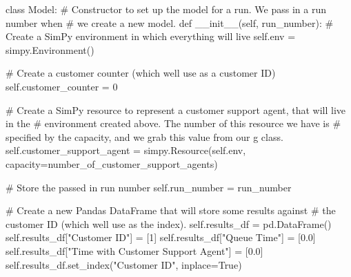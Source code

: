 \documentclass[
  letterpaper,
  DIV=11,
  numbers=noendperiod]{scrreprt}
\newenvironment{Shaded}{\begin{snugshade}}{\end{snugshade}}
\newcommand{\CommentTok}[1]{\textcolor[rgb]{0.37,0.37,0.37}{#1}}
\newcommand{\DecValTok}[1]{\textcolor[rgb]{0.68,0.00,0.00}{#1}}
\newcommand{\FloatTok}[1]{\textcolor[rgb]{0.68,0.00,0.00}{#1}}
\newcommand{\FunctionTok}[1]{\textcolor[rgb]{0.28,0.35,0.67}{#1}}
\newcommand{\KeywordTok}[1]{\textcolor[rgb]{0.00,0.23,0.31}{#1}}
\newcommand{\NormalTok}[1]{\textcolor[rgb]{0.00,0.23,0.31}{#1}}
\newcommand{\OperatorTok}[1]{\textcolor[rgb]{0.37,0.37,0.37}{#1}}
\newcommand{\StringTok}[1]{\textcolor[rgb]{0.13,0.47,0.30}{#1}}
\newcommand{\VariableTok}[1]{\textcolor[rgb]{0.07,0.07,0.07}{#1}}
\begin{document}
\begin{tcolorbox}[enhanced jigsaw, rightrule=.15mm, colback=white, colframe=quarto-callout-note-color-frame, colbacktitle=quarto-callout-note-color!10!white, toprule=.15mm, coltitle=black, opacityback=0, titlerule=0mm, bottomtitle=1mm, breakable, title=\textcolor{quarto-callout-note-color}{\faInfo}\hspace{0.5em}{Full Example model class}, opacitybacktitle=0.6, toptitle=1mm, arc=.35mm, bottomrule=.15mm, leftrule=.75mm, left=2mm]

\begin{Shaded}
\begin{Highlighting}[]
\KeywordTok{class}\NormalTok{ Model:}
    \CommentTok{\# Constructor to set up the model for a run.  We pass in a run number when}
    \CommentTok{\# we create a new model.}
    \KeywordTok{def} \FunctionTok{\_\_init\_\_}\NormalTok{(}\VariableTok{self}\NormalTok{, run\_number):}
        \CommentTok{\# Create a SimPy environment in which everything will live}
        \VariableTok{self}\NormalTok{.env }\OperatorTok{=}\NormalTok{ simpy.Environment()}

        \CommentTok{\# Create a customer counter (which we\textquotesingle{}ll use as a customer ID)}
        \VariableTok{self}\NormalTok{.customer\_counter }\OperatorTok{=} \DecValTok{0}

        \CommentTok{\# Create a SimPy resource to represent a customer support agent, that will live in the}
        \CommentTok{\# environment created above.  The number of this resource we have is}
        \CommentTok{\# specified by the capacity, and we grab this value from our g class.}
        \VariableTok{self}\NormalTok{.customer\_support\_agent }\OperatorTok{=}\NormalTok{ simpy.Resource(}\VariableTok{self}\NormalTok{.env, capacity}\OperatorTok{=}\NormalTok{number\_of\_customer\_support\_agents)}

        \CommentTok{\# Store the passed in run number}
        \VariableTok{self}\NormalTok{.run\_number }\OperatorTok{=}\NormalTok{ run\_number}

        \CommentTok{\# Create a new Pandas DataFrame that will store some results against}
        \CommentTok{\# the customer ID (which we\textquotesingle{}ll use as the index).}
        \VariableTok{self}\NormalTok{.results\_df }\OperatorTok{=}\NormalTok{ pd.DataFrame()}
        \VariableTok{self}\NormalTok{.results\_df[}\StringTok{"Customer ID"}\NormalTok{] }\OperatorTok{=}\NormalTok{ [}\DecValTok{1}\NormalTok{]}
        \VariableTok{self}\NormalTok{.results\_df[}\StringTok{"Queue Time"}\NormalTok{] }\OperatorTok{=}\NormalTok{ [}\FloatTok{0.0}\NormalTok{]}
        \VariableTok{self}\NormalTok{.results\_df[}\StringTok{"Time with Customer Support Agent"}\NormalTok{] }\OperatorTok{=}\NormalTok{ [}\FloatTok{0.0}\NormalTok{]}
        \VariableTok{self}\NormalTok{.results\_df.set\_index(}\StringTok{"Customer ID"}\NormalTok{, inplace}\OperatorTok{=}\VariableTok{True}\NormalTok{)}


\end{Highlighting}
\end{Shaded}
\end{tcolorbox}
\end{document}
